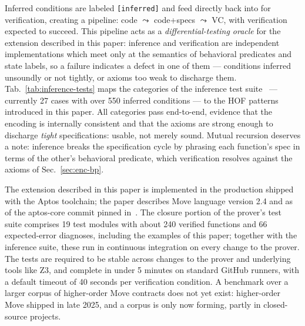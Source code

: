 \label{sec:validation-tests}

Inferred conditions are labeled \texttt{[inferred]} and feed directly back into \MVP for verification, creating a pipeline: code $\leadsto$ code+specs $\leadsto$ VC, with verification expected to succeed.
This pipeline acts as a \emph{differential-testing oracle} for the extension described in this paper: inference and verification are independent implementations which meet only at the semantics of behavioral predicates and state labels, so a failure indicates a defect in one of them --- conditions inferred unsoundly or not tightly, or axioms too weak to discharge them.
Tab.~\ref{tab:inference-tests} maps the categories of the inference test suite~\cite{InferenceTestsuite} --- currently 27 cases with over 550 inferred conditions --- to the HOF patterns introduced in this paper.
All categories pass end-to-end, evidence that the encoding is internally consistent and that the axioms are strong enough to discharge \emph{tight} specifications: usable, not merely sound.
Mutual recursion deserves a note: inference breaks the specification cycle by phrasing each function's spec in terms of the other's behavioral predicate, which verification resolves against the axioms of Sec.~\ref{sec:enc-bp}.

\label{sec:empirical}

The extension described in this paper is implemented in the production \MVP shipped with the Aptos toolchain; the paper describes Move language version 2.4 and \MVP as of the aptos-core commit pinned in~\cite{PaperExamples, InferenceTestsuite}.
The closure portion of the prover's test suite comprises 19 test modules with about 240 verified functions and 66 expected-error diagnoses, including the examples of this paper; together with the inference suite, these run in continuous integration on every change to the prover.
The tests are required to be stable across changes to the prover and underlying tools like Z3, and complete in under 5 minutes on standard GitHub runners, with a default timeout of 40 seconds per verification condition.
A benchmark over a larger corpus of higher-order Move contracts does not yet exist: higher-order Move shipped in late 2025, and a corpus is only now forming, partly in closed-source projects.




